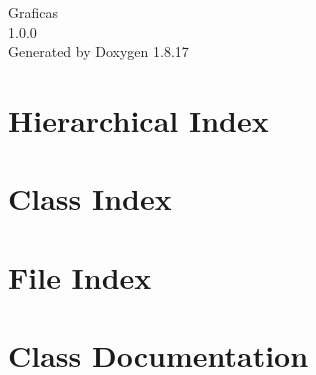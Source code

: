 \let\mypdfximage\pdfximage\def\pdfximage{\immediate\mypdfximage}\documentclass[twoside]{book}
\newcommand{\+}{\discretionary{\mbox{\scriptsize$\hookleftarrow$}}{}{}}
\newcommand{\clearemptydoublepage}{%
  \newpage{\pagestyle{empty}\cleardoublepage}%
}
\begin{document}
\hypersetup{pageanchor=false,
             bookmarksnumbered=true,
             pdfencoding=unicode
            }
\begin{titlepage}
\vspace*{7cm}
\begin{center}%
{\Large Graficas \\[1ex]\large 1.\+0.\+0 }\\
\vspace*{1cm}
{\large Generated by Doxygen 1.8.17}\\
\end{center}
\end{titlepage}
\clearemptydoublepage
{}
\tableofcontents
\clearemptydoublepage
{}
\hypersetup{pageanchor=true}

\chapter{Hierarchical Index}

\chapter{Class Index}

\chapter{File Index}

\chapter{Class Documentation}


















































\end{document}
